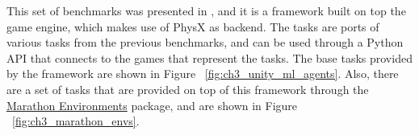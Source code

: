 This set of benchmarks was presented in \cite{UnityMLAgents}, and it is a framework 
built on top the \citeauthor{Unity} game engine, which makes use of PhysX as backend. 
The tasks are ports of various tasks from the previous benchmarks, and can be used
through a Python API that connects to the games that represent the tasks. The base tasks
provided by the framework are shown in Figure ~\ref{fig:ch3_unity_ml_agents}. Also, 
there are a set of tasks that are provided on top of this framework through the 
\href{https://github.com/Unity-Technologies/marathon-envs}{Marathon Environments} 
package, and are shown in Figure ~\ref{fig:ch3_marathon_envs}.

\figBenchmarksUnityMLAgents

\figBenchmarksMarathonEnvs